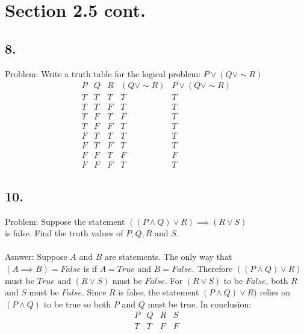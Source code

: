 \documentclass[12pt]{article}
\begin{document}
\begin{minipage}[t]{0.40\textwidth}
\section*{Section 2.5 cont.}
\subsection*{8.}
Problem: Write a truth table for the logical problem: 
$ P \lor (Q \lor \sim R)$\\
\[
\begin{array}{c|c|c|c|c}
P & Q & R &(Q \lor \sim R) & P \lor (Q \lor \sim R)\\
\hline
T & T & T & T & T\\
T & T & F & T & T\\
T & F & T & F & T\\
T & F & F & T & T\\
F & T & T & T & T\\
F & T & F & T & T\\
F & F & T & F & F\\
F & F & F & T & T
\end{array}
\]

\subsection*{10.}
Problem: Suppose the statement $ ((P \land Q) \lor R) \implies (R \lor S)$\\
is false. Find the truth values of $ P,Q,R $ and $ S. $\\\\
Asnwer: Suppose $ A $ and $ B $ are statements. The only way that $(A \implies B)=False$ is if $ A=True $ and $ B=False $. Therefore $ ((P \land Q) \lor R)$ must be $ True $ and $ (R \lor S) $ must be $ False $. For $ (R \lor S) $ to be $ False $, both $ R $ and $ S $ must be $ False $. Since $ R $ is false, the statement $ (P \land Q) \lor R) $ relies on $ (P \land Q) $ to be true so both $ P $ and $ Q $ must be true. In conclusion: 
$$
\begin{array}{c|c|c|c}
	P & Q & R & S\\
	\hline
	T & T & F & F\\
\end{array}
$$

\end{minipage}
\hfill\vline\hfill
\end{document}
